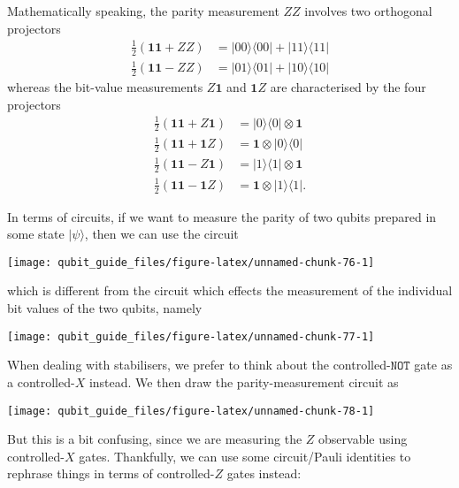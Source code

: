 \documentclass[fleqn]{article}
\begin{document}
Mathematically speaking, the parity measurement \(ZZ\) involves two orthogonal projectors
\[
  \begin{aligned}
    \frac{1}{2}(\mathbf{1}\mathbf{1}+ZZ)
    &= |00\rangle\langle 00|+|11\rangle\langle 11|
  \\\frac{1}{2}(\mathbf{1}\mathbf{1}-ZZ)
    &= |01\rangle\langle 01|+|10\rangle\langle 10|
  \end{aligned}
\]
whereas the bit-value measurements \(Z\mathbf{1}\) and \(\mathbf{1}Z\) are characterised by the four projectors
\[
  \begin{aligned}
    \frac{1}{2}(\mathbf{1}\mathbf{1}+Z\mathbf{1})
    &= |0\rangle\langle 0|\otimes\mathbf{1}
  \\\frac{1}{2}(\mathbf{1}\mathbf{1}+\mathbf{1}Z)
    &= \mathbf{1}\otimes|0\rangle\langle 0|
  \\\frac{1}{2}(\mathbf{1}\mathbf{1}-Z\mathbf{1})
    &= |1\rangle\langle 1|\otimes\mathbf{1}
  \\\frac{1}{2}(\mathbf{1}\mathbf{1}-\mathbf{1}Z)
    &= \mathbf{1}\otimes|1\rangle\langle 1|.
  \end{aligned}
\]

In terms of circuits, if we want to measure the parity of two qubits prepared in some state \(|\psi\rangle\), then we can use the circuit

\begin{center}\texttt{[image: qubit\_guide\_files/figure-latex/unnamed-chunk-76-1]} \end{center}

which is different from the circuit which effects the measurement of the individual bit values of the two qubits, namely

\begin{center}\texttt{[image: qubit\_guide\_files/figure-latex/unnamed-chunk-77-1]} \end{center}

When dealing with stabilisers, we prefer to think about the controlled-\(\texttt{NOT}\) gate as a controlled-\(X\) instead.
We then draw the parity-measurement circuit as

\begin{center}\texttt{[image: qubit\_guide\_files/figure-latex/unnamed-chunk-78-1]} \end{center}

But this is a bit confusing, since we are measuring the \(Z\) observable using controlled-\(X\) gates.
Thankfully, we can use some circuit/Pauli identities to rephrase things in terms of controlled-\(Z\) gates instead:
\end{document}
